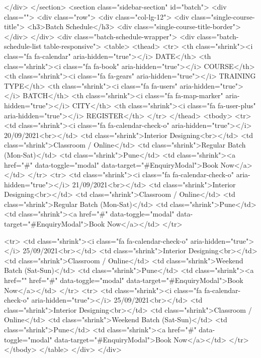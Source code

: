 {</div>
</section>
<section class="sidebar-section" id="batch">
<div class="">
<div class="row">
<div class="col-lg-12">
<div class="single-course-title">
<h3>Batch Schedule</h3>
<div class="single-course-title-border"></div>
</div>
<div class="batch-schedule-wrapper">
<div class="batch-schedule-list table-responsive">
<table>
<thead>
<tr>
<th class="shrink"><i class="fa fa-calendar" aria-hidden="true"></i> DATE</th>
<th class="shrink"><i class="fa fa-book" aria-hidden="true"></i> COURSE</th>
<th class="shrink"><i class="fa fa-gears" aria-hidden="true"></i> TRAINING TYPE</th>
<th class="shrink"><i class="fa fa-users" aria-hidden="true"></i> BATCH</th>
<th class="shrink"><i class="fa fa-map-marker" aria-hidden="true"></i> CITY</th>
<th class="shrink"><i class="fa fa-user-plus" aria-hidden="true"></i> REGISTER</th>
</tr>
</thead>
<tbody>
<tr>
<td class="shrink"><i class="fa fa-calendar-check-o" aria-hidden="true"></i> 20/09/2021<br></td>
<td class="shrink">Interior Designing<br></td>
<td class="shrink">Classroom / Online</td>
<td class="shrink">Regular Batch (Mon-Sat)</td>
<td class="shrink">Pune</td>
<td class="shrink"><a href="#" data-toggle="modal" data-target="#EnquiryModal">Book Now</a></td>
</tr>
<tr>
<td class="shrink"><i class="fa fa-calendar-check-o" aria-hidden="true"></i> 21/09/2021<br></td>
<td class="shrink">Interior Designing<br></td>
<td class="shrink">Classroom / Online</td>
<td class="shrink">Regular Batch (Mon-Sat)</td>
<td class="shrink">Pune</td>
<td class="shrink"><a href="#" data-toggle="modal" data-target="#EnquiryModal">Book Now</a></td>
</tr>

<tr>
<td class="shrink"><i class="fa fa-calendar-check-o" aria-hidden="true"></i> 25/09/2021<br></td>
<td class="shrink">Interior Designing<br></td>
<td class="shrink">Classroom / Online</td>
<td class="shrink">Weekend Batch (Sat-Sun)</td>
<td class="shrink">Pune</td>
<td class="shrink"><a href="" href="#" data-toggle="modal" data-target="#EnquiryModal">Book Now</a></td>
</tr>
<tr>
<td class="shrink"><i class="fa fa-calendar-check-o" aria-hidden="true"></i> 25/09/2021<br></td>
<td class="shrink">Interior Designing<br></td>
<td class="shrink">Classroom / Online</td>
<td class="shrink">Weekend Batch (Sat-Sun)</td>
<td class="shrink">Pune</td>
<td class="shrink"><a href="#" data-toggle="modal" data-target="#EnquiryModal">Book Now</a></td>
</tr>
 </tbody>
</table>
</div>
</div>

}
